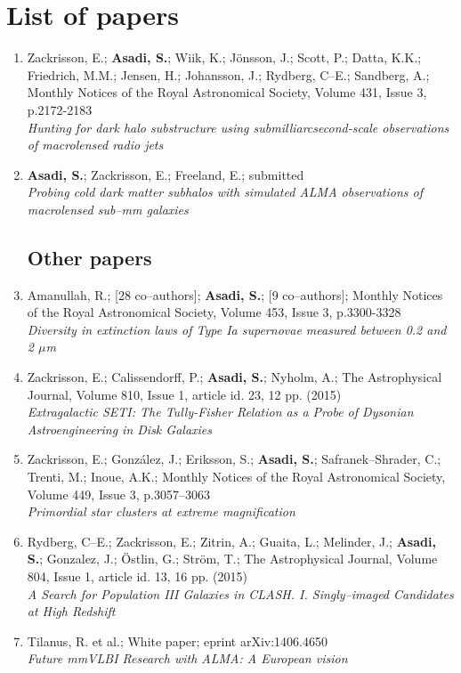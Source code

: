 \documentclass[a4wide,12pt]{book}
\begin{document}
{\clearpage

\thispagestyle{empty}

\section*{List of papers}
  \begin{enumerate}[I]
    \subsection*{Included in this thesis}
      \item Zackrisson, E.; {\bf Asadi, S.}; Wiik, K.; J{\"o}nsson, J.; Scott, P.; Datta, K.K.; Friedrich, M.M.; Jensen, H.; Johansson, J.; Rydberg, C--E.; Sandberg, A.;  Monthly Notices of the Royal Astronomical Society, Volume 431, Issue 3, p.2172-2183 \\{\it Hunting for dark halo substructure using submilliarcsecond-scale observations of macrolensed radio jets}
      \item {\bf Asadi, S.}; Zackrisson, E.; Freeland, E.; submitted\\{\it Probing cold dark matter subhalos with simulated ALMA observations of macrolensed sub–mm galaxies}
    \subsection*{Other papers}
      \item Amanullah, R.; [28 co--authors]; {\bf Asadi, S.};  [9 co--authors]; Monthly Notices of the Royal Astronomical Society, Volume 453, Issue 3, p.3300-3328 \\{\it Diversity in extinction laws of Type Ia supernovae measured between 0.2 and 2 $\mu$m}
      \item Zackrisson, E.; Calissendorff, P.; {\bf Asadi, S.}; Nyholm, A.; The Astrophysical Journal, Volume 810, Issue 1, article id. 23, 12 pp. (2015)\\{\it Extragalactic SETI: The Tully-Fisher Relation as a Probe of Dysonian Astroengineering in Disk Galaxies}
      \item Zackrisson, E.; González, J.; Eriksson, S.; {\bf Asadi, S.}; Safranek--Shrader, C.; Trenti, M.; Inoue, A.K.; Monthly Notices of the Royal Astronomical Society, Volume 449, Issue 3, p.3057--3063\\{\it Primordial star clusters at extreme magnification}
      \item Rydberg, C--E.; Zackrisson, E.; Zitrin, A.; Guaita, L.; Melinder, J.; {\bf Asadi, S.}; Gonzalez, J.; {\"O}stlin, G.; Str{\"o}m, T.; The Astrophysical Journal, Volume 804, Issue 1, article id. 13, 16 pp. (2015)\\{\it A Search for Population III Galaxies in CLASH. I. Singly--imaged Candidates at High Redshift}
      \item Tilanus, R. et al.; White paper; eprint arXiv:1406.4650\\{\it Future mmVLBI Research with ALMA: A European vision}
  \end{enumerate}

}
\end{document}
